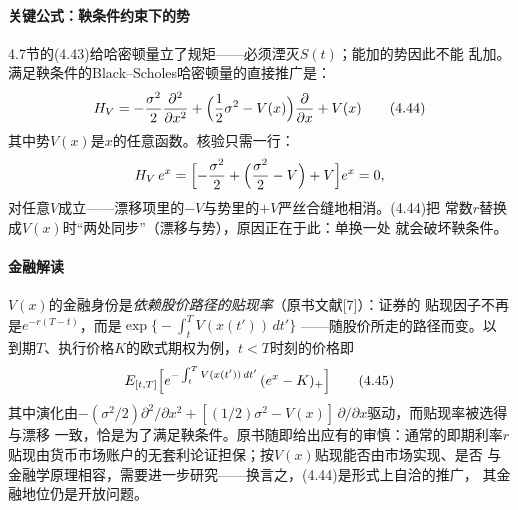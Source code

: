 \paragraph{关键公式：鞅条件约束下的势}
4.7节的(4.43)给哈密顿量立了规矩——必须湮灭$S(t)$；能加的势因此不能
乱加。满足鞅条件的Black--Scholes哈密顿量的直接推广是：
\begin{equation*}
H_{V}=-\frac{\sigma^{2}}{2}\frac{\partial^{2}}{\partial x^{2}}
+\Bigl(\frac{1}{2}\sigma^{2}-V(x)\Bigr)\frac{\partial}{\partial x}
+V(x)
\tag{4.44}
\end{equation*}
其中势$V(x)$是$x$的任意函数。核验只需一行：
\begin{equation*}
H_{V}\,e^{x}
=\Bigl[-\frac{\sigma^{2}}{2}+\Bigl(\frac{\sigma^{2}}{2}-V\Bigr)+V\Bigr]
e^{x}=0,
\end{equation*}
对任意$V$成立——漂移项里的$-V$与势里的$+V$严丝合缝地相消。(4.44)把
常数$r$替换成$V(x)$时“两处同步”（漂移与势），原因正在于此：单换一处
就会破坏鞅条件。

\paragraph{金融解读}
$V(x)$的金融身份是\emph{依赖股价路径的贴现率}（原书文献[7]）：证券的
贴现因子不再是$e^{-r(T-t)}$，而是$\exp\bigl\{-\int_{t}^{T}V(x(t'))\,dt'\bigr\}$
——随股价所走的路径而变。以
到期$T$、执行价格$K$的欧式期权为例，$t<T$时刻的价格即
\begin{equation*}
E_{[t,T]}\Bigl[e^{-\int_{t}^{T}V(x(t'))\,dt'}\,(e^{x}-K)_{+}\Bigr]
\tag{4.45}
\end{equation*}
其中演化由$-(\sigma^{2}/2)\partial^{2}/\partial x^{2}
+[(1/2)\sigma^{2}-V(x)]\,\partial/\partial x$驱动，而贴现率被选得与漂移
一致，恰是为了满足鞅条件。原书随即给出应有的审慎：通常的即期利率$r$
贴现由货币市场账户的无套利论证担保；按$V(x)$贴现能否由市场实现、是否
与金融学原理相容，需要进一步研究——换言之，(4.44)是形式上自洽的推广，
其金融地位仍是开放问题。

